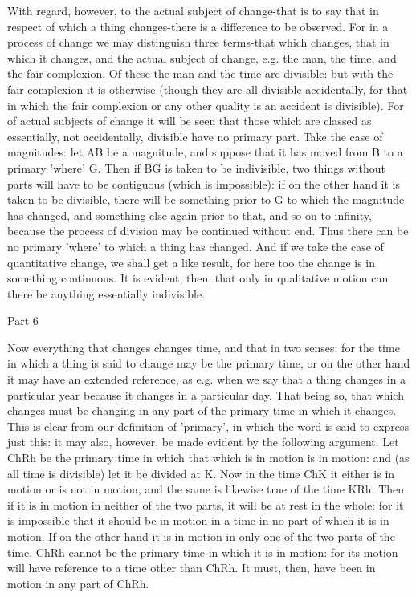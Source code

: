 With regard, however, to the actual subject of change-that is to say
that in respect of which a thing changes-there is a difference to
be observed. For in a process of change we may distinguish three terms-that
which changes, that in which it changes, and the actual subject of
change, e.g. the man, the time, and the fair complexion. Of these
the man and the time are divisible: but with the fair complexion it
is otherwise (though they are all divisible accidentally, for that
in which the fair complexion or any other quality is an accident is
divisible). For of actual subjects of change it will be seen that
those which are classed as essentially, not accidentally, divisible
have no primary part. Take the case of magnitudes: let AB be a magnitude,
and suppose that it has moved from B to a primary 'where' G. Then
if BG is taken to be indivisible, two things without parts will have
to be contiguous (which is impossible): if on the other hand it is
taken to be divisible, there will be something prior to G to which
the magnitude has changed, and something else again prior to that,
and so on to infinity, because the process of division may be continued
without end. Thus there can be no primary 'where' to which a thing
has changed. And if we take the case of quantitative change, we shall
get a like result, for here too the change is in something continuous.
It is evident, then, that only in qualitative motion can there be
anything essentially indivisible. 

Part 6

Now everything that changes changes time, and that in two senses:
for the time in which a thing is said to change may be the primary
time, or on the other hand it may have an extended reference, as e.g.
when we say that a thing changes in a particular year because it changes
in a particular day. That being so, that which changes must be changing
in any part of the primary time in which it changes. This is clear
from our definition of 'primary', in which the word is said to express
just this: it may also, however, be made evident by the following
argument. Let ChRh be the primary time in which that which is in motion
is in motion: and (as all time is divisible) let it be divided at
K. Now in the time ChK it either is in motion or is not in motion,
and the same is likewise true of the time KRh. Then if it is in motion
in neither of the two parts, it will be at rest in the whole: for
it is impossible that it should be in motion in a time in no part
of which it is in motion. If on the other hand it is in motion in
only one of the two parts of the time, ChRh cannot be the primary
time in which it is in motion: for its motion will have reference
to a time other than ChRh. It must, then, have been in motion in any
part of ChRh. 

